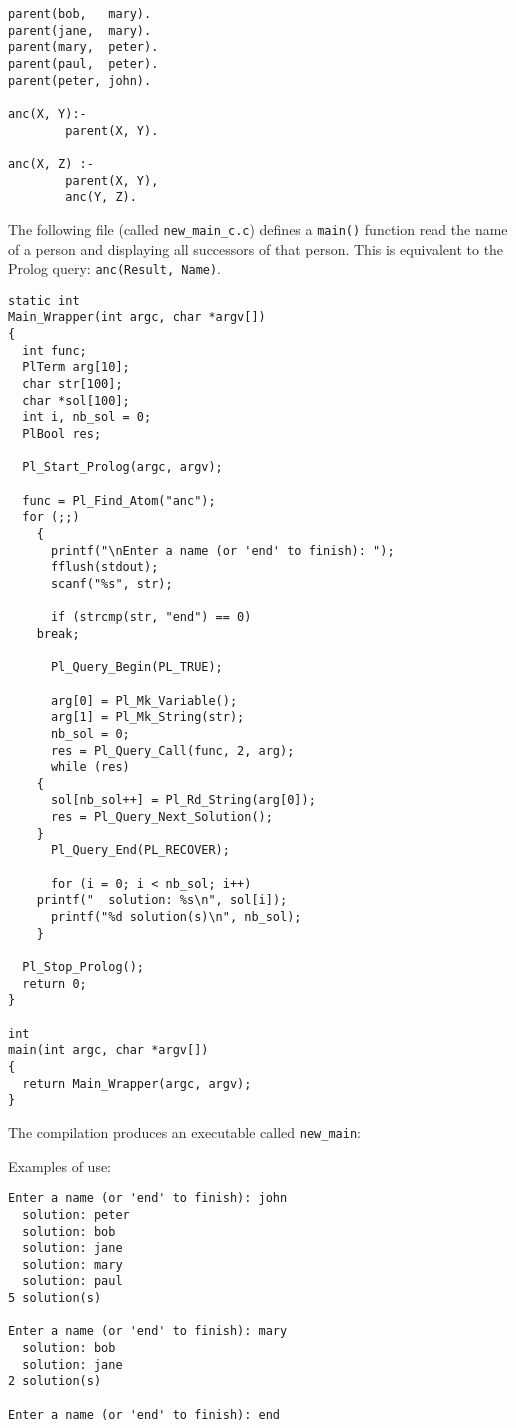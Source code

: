 \begin{Indentation}
\begin{verbatim}
parent(bob,   mary).
parent(jane,  mary).
parent(mary,  peter).
parent(paul,  peter).
parent(peter, john).

anc(X, Y):-
        parent(X, Y).

anc(X, Z) :-
        parent(X, Y),
        anc(Y, Z).
\end{verbatim}
\end{Indentation}

The following file (called \texttt{new\_main\_c.c}) defines a \texttt{main()}
function read the name of a person and displaying all successors of that
person. This is equivalent to the Prolog query: \texttt{anc(Result, Name)}.

\begin{Indentation}
\begin{verbatim}
static int
Main_Wrapper(int argc, char *argv[])
{
  int func;
  PlTerm arg[10];
  char str[100];
  char *sol[100];
  int i, nb_sol = 0;
  PlBool res;

  Pl_Start_Prolog(argc, argv);

  func = Pl_Find_Atom("anc");
  for (;;)
    {
      printf("\nEnter a name (or 'end' to finish): ");
      fflush(stdout);
      scanf("%s", str);

      if (strcmp(str, "end") == 0)
	break;

      Pl_Query_Begin(PL_TRUE);

      arg[0] = Pl_Mk_Variable();
      arg[1] = Pl_Mk_String(str);
      nb_sol = 0;
      res = Pl_Query_Call(func, 2, arg);
      while (res)
	{
	  sol[nb_sol++] = Pl_Rd_String(arg[0]);
	  res = Pl_Query_Next_Solution();
	}
      Pl_Query_End(PL_RECOVER);

      for (i = 0; i < nb_sol; i++)
	printf("  solution: %s\n", sol[i]);
      printf("%d solution(s)\n", nb_sol);
    }

  Pl_Stop_Prolog();
  return 0;
}

int
main(int argc, char *argv[])
{
  return Main_Wrapper(argc, argv);
}
\end{verbatim}
\end{Indentation}

The compilation produces an executable called \texttt{new\_main}:


Examples of use:

\begin{Indentation}
\begin{verbatim}
Enter a name (or 'end' to finish): john
  solution: peter
  solution: bob
  solution: jane
  solution: mary
  solution: paul
5 solution(s)

Enter a name (or 'end' to finish): mary
  solution: bob
  solution: jane
2 solution(s)

Enter a name (or 'end' to finish): end
\end{verbatim}
\end{Indentation}

